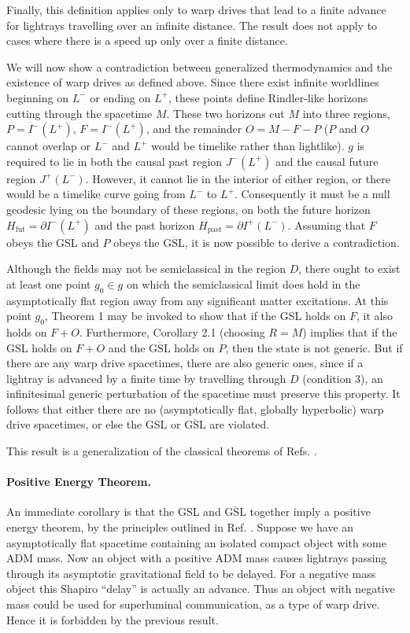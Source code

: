 \documentclass[12pt]{article}
\begin{document}
Finally, this definition applies only to warp drives that lead to a finite advance for lightrays travelling over an infinite distance.  The result does not apply to cases where there is a speed up only over a finite distance.

We will now show a contradiction between generalized thermodynamics and the existence of warp drives as defined above.  Since there exist infinite worldlines beginning on $L^-$ or ending on $L^+$, these points define Rindler-like horizons cutting through the spacetime $M$.  These two horizons cut $M$ into three regions, $P = I^-(L^+)$, $F = I^-(L^+)$, and the remainder $O = M - F - P$ ($P$ and $O$ cannot overlap or $L^-$ and $L^+$ would be timelike rather than lightlike).  $g$ is required to lie in both the causal past region $J^-(L^+)$ and the causal future region $J^+(L^-)$.  However, it cannot lie in the interior of either region, or there would be a timelike curve going from $L^-$ to $L^+$.  Consequently it must be a null geodesic lying on the boundary of these regions, on both the future horizon $H_\mathrm{fut} = \partial I^-(L^+)$ and the past horizon $H_\mathrm{past} = \partial I^+(L^-)$.  Assuming that $F$ obeys the GSL and $P$ obeys the $\overline{\mathrm{GSL}}$, it is now possible to derive a contradiction.

Although the fields may not be semiclassical in the region $D$, there ought to exist at least one point $g_0 \in g$ on which the semiclassical limit does hold in the asymptotically flat region away from any significant matter excitations.  At this point $g_0$, Theorem 1 may be invoked to show that if the GSL holds on $F$, it also holds on $F + O$.  Furthermore, Corollary 2.1 (choosing $R = M$) implies that if the GSL holds on $F + O$ and the $\overline{\mathrm{GSL}}$ holds on $P$, then the state is not generic.  But if there are any warp drive spacetimes, there are also generic ones, since if a lightray is advanced by a finite time by travelling through $D$ (condition 3), an infinitesimal generic perturbation of the spacetime must preserve this property.  It follows that either there are no (asymptotically flat, globally hyperbolic) warp drive spacetimes, or else the GSL or $\overline{\mathrm{GSL}}$ are violated.

This result is a generalization of the classical theorems of Refs. \cite{olum, supercensor, GW00}.

\paragraph{Positive Energy Theorem.}  An immediate corollary is that the GSL and $\overline{\mathrm{GSL}}$ together imply a positive energy theorem, by the principles outlined in Ref. \cite{SPW}.  Suppose we have an asymptotically flat spacetime containing an isolated compact object with some ADM mass.  Now an object with a positive ADM mass causes lightrays passing through its asymptotic gravitational field to be delayed.  For a negative mass object this Shapiro ``delay'' is actually an advance.  Thus an object with negative mass could be used for superluminal communication, as a type of warp drive.  Hence it is forbidden by the previous result.
\end{document}
